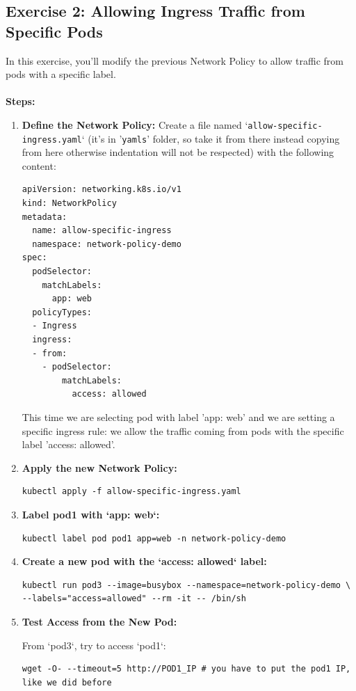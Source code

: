\documentclass{article}
\begin{document}
\subsection{Exercise 2: Allowing Ingress Traffic from Specific Pods}
In this exercise, you'll modify the previous Network Policy to allow traffic from pods with a specific label. \\
\\
\textbf{Steps:}
\begin{enumerate}
    \item \textbf{Define the Network Policy:}
    Create a file named `\texttt{allow-specific-ingress.yaml}` (it's in '\texttt{yamls}' folder, so take it from there instead copying from here otherwise indentation will not be respected) with the following content:
    \begin{lstlisting}
apiVersion: networking.k8s.io/v1
kind: NetworkPolicy
metadata:
  name: allow-specific-ingress
  namespace: network-policy-demo
spec:
  podSelector:
    matchLabels:
      app: web
  policyTypes:
  - Ingress
  ingress:
  - from:
    - podSelector:
        matchLabels:
          access: allowed
    \end{lstlisting}
    This time we are selecting pod with label 'app: web' and we are setting a specific ingress rule: we allow the traffic coming from pods with the specific label 'access: allowed'.

    \item \textbf{Apply the new Network Policy:}
    \begin{lstlisting}
kubectl apply -f allow-specific-ingress.yaml
    \end{lstlisting}

    \item \textbf{Label pod1 with `app: web`:}
    \begin{lstlisting}
kubectl label pod pod1 app=web -n network-policy-demo
    \end{lstlisting}

    \item \textbf{Create a new pod with the `access: allowed` label:}
    \begin{lstlisting}
kubectl run pod3 --image=busybox --namespace=network-policy-demo \
--labels="access=allowed" --rm -it -- /bin/sh
    \end{lstlisting}

    \item \textbf{Test Access from the New Pod:}
    
    From `pod3`, try to access `pod1`:
    \begin{lstlisting}
wget -O- --timeout=5 http://POD1_IP # you have to put the pod1 IP, like we did before
    \end{lstlisting}
    

\end{enumerate}
\end{document}
